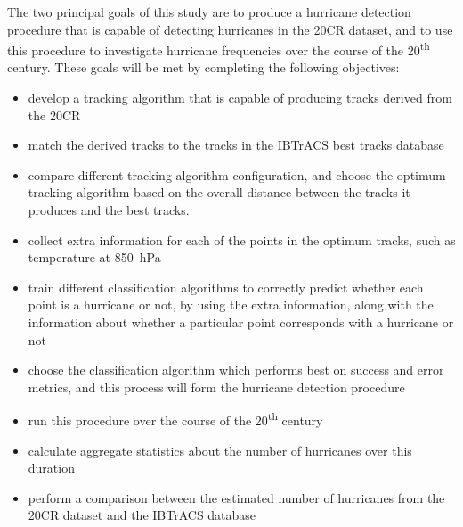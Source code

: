 \documentclass[pdftex,12pt,a4paper]{report}
\newcommand{\ts}{\textsuperscript}
\begin{document}
The two principal goals of this study are to produce a hurricane detection procedure that is capable
of detecting hurricanes in the 20CR dataset, and to use this procedure to investigate hurricane
frequencies over the course of the 20\ts{th} century. These goals will be met by completing the
following objectives:

\begin{itemize}
    \item develop a tracking algorithm that is capable of producing tracks derived from the 20CR
    \item match the derived tracks to the tracks in the IBTrACS best tracks database
    \item compare different tracking algorithm configuration, and choose the optimum tracking
        algorithm based on the overall distance between the tracks it produces and the best tracks.
    \item collect extra information for each of the points in the optimum tracks, such as
        temperature at \SI{850}{hPa}
    \item train different classification algorithms to correctly predict whether each point is a
        hurricane or not, by using the extra information, along with the information about whether a
        particular point corresponds with a hurricane or not
    \item choose the classification algorithm which performs best on success and error metrics, and
        this process will form the hurricane detection procedure
    \item run this procedure over the course of the 20\ts{th} century
    \item calculate aggregate statistics about the number of hurricanes over this duration
    \item perform a comparison between the estimated number of hurricanes from the 20CR dataset and
        the IBTrACS database
\end{itemize}

\end{document}
